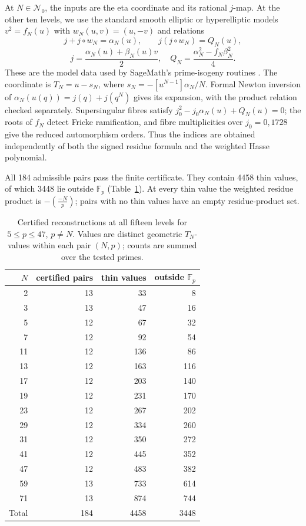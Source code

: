 \documentclass[11pt,a4paper]{article}
\numberwithin{equation}{section}
\theoremstyle{definition}
\theoremstyle{remark}
\newcommand{\Fp}{\mathbb F_p}
\begin{document}
At $N\in\mathcal N_0$, the inputs are the eta coordinate and its rational
$j$-map. At the other ten levels, we use the standard smooth elliptic or
hyperelliptic models $v^2=f_N(u)$ with $w_N(u,v)=(u,-v)$ and relations
\[
j+j\circ w_N=\alpha_N(u),\qquad
j(j\circ w_N)=Q_N(u),
\]
\[
j=\frac{\alpha_N(u)+\beta_N(u)v}{2},
\quad Q_N=\frac{\alpha_N^2-f_N\beta_N^2}{4}.
\]
These are the model data used by SageMath's prime-isogeny routines
\citep{SageModels}. The coordinate is $T_N=u-s_N$, where
$s_N=-[u^{N-1}]\alpha_N/N$. Formal Newton inversion of
$\alpha_N(u(q))=j(q)+j(q^N)$ gives its expansion, with the product relation
checked separately. Supersingular fibres satisfy
$j_0^2-j_0\alpha_N(u)+Q_N(u)=0$; the roots of $f_N$ detect Fricke
ramification, and fibre multiplicities over $j_0=0,1728$ give the reduced
automorphism orders. Thus the indices are obtained independently of both
the signed residue formula and the weighted Hasse polynomial.

All 184 admissible pairs pass the finite certificate. They contain
4458 thin values, of which 3448 lie outside $\Fp$
(Table~\ref{tab:all-levels}).
At every thin value the weighted residue product is
$-\left(\frac{-N}{p}\right)$; pairs with no thin values have an empty
residue-product set.

\begin{table}[htbp]\centering\small
\begin{tabular}{rrrr}\toprule
$N$ & certified pairs & thin values & outside $\Fp$\\\midrule
2&13&33&8\\
3&13&47&16\\
5&12&67&32\\
7&12&92&54\\
11&12&136&86\\
13&12&163&116\\
17&12&203&140\\
19&12&231&170\\
23&12&267&202\\
29&12&334&260\\
31&12&350&272\\
41&12&445&352\\
47&12&483&382\\
59&13&733&614\\
71&13&874&744\\
\midrule
Total&184&4458&3448\\\bottomrule
\end{tabular}
\caption{Certified reconstructions at all fifteen levels for
$5\le p\le47$, $p\ne N$. Values are distinct geometric $T_N$-values
within each pair $(N,p)$; counts are summed over the tested primes.}
\label{tab:all-levels}
\end{table}
\end{document}
